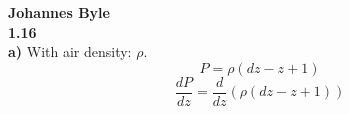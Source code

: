 \documentclass[english]{article}
\begin{document}
\textbf{Johannes Byle}\\
\noindent
\textbf{1.16}\\
\textbf{a)}
With air density: $\rho$.
$$P=\rho(dz-z+1)$$
$$\frac{dP}{dz}=\frac{d}{dz}\left(\rho(dz-z+1)\right)$$
\end{document}
